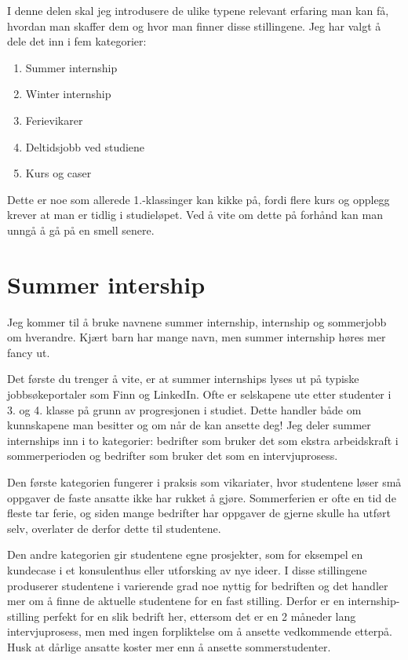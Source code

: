 
I denne delen skal jeg introdusere de ulike typene relevant erfaring man kan få, hvordan man skaffer dem og hvor man finner disse stillingene. Jeg har valgt å dele det inn i fem kategorier:

\begin{enumerate}
    \item Summer internship
    \item Winter internship
    \item Ferievikarer
    \item Deltidsjobb ved studiene
    \item Kurs og caser
\end{enumerate}

Dette er noe som allerede 1.-klassinger kan kikke på, fordi flere kurs og opplegg krever at man er tidlig i studieløpet. Ved å vite om dette på forhånd kan man unngå å gå på en smell senere.


\section{Summer intership}

Jeg kommer til å bruke navnene summer internship, internship og sommerjobb om hverandre. Kjært barn har mange navn, men summer internship høres mer fancy ut.

Det første du trenger å vite, er at summer internships lyses ut på typiske jobbsøkeportaler som Finn og LinkedIn. Ofte er selskapene ute etter studenter i 3. og 4. klasse på grunn av progresjonen i studiet. Dette handler både om kunnskapene man besitter og om når de kan ansette deg! Jeg deler summer internships inn i to kategorier: bedrifter som bruker det som ekstra arbeidskraft i sommerperioden og bedrifter som bruker det som en intervjuprosess.

Den første kategorien fungerer i praksis som vikariater, hvor studentene løser små oppgaver de faste ansatte ikke har rukket å gjøre. Sommerferien er ofte en tid de fleste tar ferie, og siden mange bedrifter har oppgaver de gjerne skulle ha utført selv, overlater de derfor dette til studentene.

Den andre kategorien gir studentene egne prosjekter, som for eksempel en kundecase i et konsulenthus eller utforsking av nye ideer. I disse stillingene produserer studentene i varierende grad noe nyttig for bedriften og det handler mer om å finne de aktuelle studentene for en fast stilling. Derfor er en internship-stilling perfekt for en slik bedrift her, ettersom det er en 2 måneder lang intervjuprosess, men med ingen forpliktelse om å ansette vedkommende etterpå. Husk at dårlige ansatte koster mer enn å ansette sommerstudenter.

